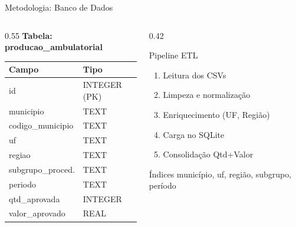 \documentclass[aspectratio=169,10pt]{beamer}
\begin{document}
\begin{frame}{Metodologia: Banco de Dados}

\begin{columns}[T]
\begin{column}{0.55\textwidth}
    \textbf{Tabela: producao\_ambulatorial}
    \vspace{0.2cm}

    \begin{tabular}{ll}
    \toprule
    \textbf{Campo} & \textbf{Tipo} \\
    \midrule
    id & INTEGER (PK) \\
    municipio & TEXT \\
    codigo\_municipio & TEXT \\
    uf & TEXT \\
    regiao & TEXT \\
    subgrupo\_proced. & TEXT \\
    periodo & TEXT \\
    qtd\_aprovada & INTEGER \\
    valor\_aprovado & REAL \\
    \bottomrule
    \end{tabular}
\end{column}
\begin{column}{0.42\textwidth}
    \begin{block}{Pipeline ETL}
    \begin{enumerate}
        \item Leitura dos CSVs
        \item Limpeza e normalização
        \item Enriquecimento (UF, Região)
        \item Carga no SQLite
        \item Consolidação Qtd+Valor
    \end{enumerate}
    \end{block}

    \vspace{0.3cm}
    \begin{alertblock}{Índices}
    município, uf, região, subgrupo, período
    \end{alertblock}
\end{column}
\end{columns}

\end{frame}
\end{document}
